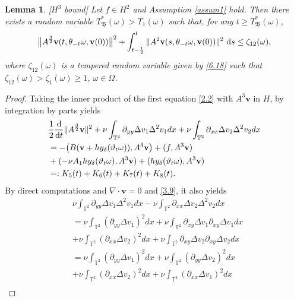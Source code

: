 \documentclass{elsarticle}
\newtheorem{lemma}[theorem]{Lemma}
\theoremstyle{definition}
\numberwithin{equation}{section}
\renewcommand{\d}{{\rm{d}}}
\begin{document}
\begin{lemma}\label{lemma7.2} [$H^3$ bound]
Let  $f\in H^2$ and Assumption \ref{assum1} hold.
Then there exists a random variable $ T_{\mathfrak B}^* (\omega)>T_1(\omega)$ such that,  for any $t\geq T_{\mathfrak B}^* (\omega)$,
\begin{align*}
\big\|A^\frac32\textbf{v}(t,\theta_{-t}\omega,\textbf{v}(0))  \big\|^2 + \int_{t-\frac 12 }^t \|A^{2}\textbf{v}(s,\theta_{-t}\omega,\textbf{v}(0))\|^2  \ \d s
\leq  \zeta_{12}(\omega),
\end{align*}
where $\zeta_{12}(\omega)$  is a tempered random variable given by \eqref{6.18} such that $\zeta_{12}(\omega) > \zeta_1(\omega)\geq 1$, $ \omega\in\Omega$.
\end{lemma}
\begin{proof}
Taking the inner product of the first equation   \eqref{2.2} with $A^3\textbf{v}$ in $H$, by integration by parts yields
\begin{align}\label{6.8}
&\frac12\frac{\d}{\d t}\|A^\frac32\textbf{v}\|^2+\nu \int_{\mathbb{T}^2}\partial_{yy}\Delta v_1\Delta^2 v_1dx+\nu \int_{\mathbb{T}^2}\partial_{xx}\Delta v_2\Delta^2 v_2dx\nonumber\\
&=-\big(B(\textbf{v}+hy_\delta(\vartheta_t\omega)), A^3\textbf{v} \big)+(f,A^3\textbf{v})\nonumber\\
& +(-\nu A_1hy_\delta(\vartheta_t\omega),A^3\textbf{v})+(hy_\delta(\vartheta_t\omega),A^3\textbf{v})\nonumber\\
&=:K_5(t)+K_6(t)+K_7(t)+K_8(t).
\end{align}
By direct computations and $\nabla\cdot \textbf{v}=0$ and \eqref{3.9}, it also yields
\begin{align}\label{6.11}
&\nu \int_{\mathbb{T}^2}\partial_{yy}\Delta v_1\Delta^2 v_1dx-\nu \int_{\mathbb{T}^2}\partial_{xx}\Delta v_2\Delta^2 v_2dx\nonumber\\
&= \nu \int_{\mathbb{T}^2}(\partial_{yy}\Delta v_1)^2dx+\nu \int_{\mathbb{T}^2}\partial_{xy}\Delta v_1\partial_{xy}\Delta v_1dx\nonumber\\
&+\nu \int_{\mathbb{T}^2}(\partial_{xx}\Delta v_2)^2dx+\nu \int_{\mathbb{T}^2}\partial_{xy}\Delta v_2\partial_{xy}\Delta v_2dx
\nonumber\\
&=\nu \int_{\mathbb{T}^2}(\partial_{yy}\Delta v_1)^2dx+\nu \int_{\mathbb{T}^2}(\partial_{yy}\Delta v_2)^2dx\nonumber\\
&+\nu \int_{\mathbb{T}^2}(\partial_{xx}\Delta v_2)^2dx+\nu \int_{\mathbb{T}^2}(\partial_{xx}\Delta v_1)^2dx
\nonumber\\

\end{align}
\end{proof}
\end{document}
